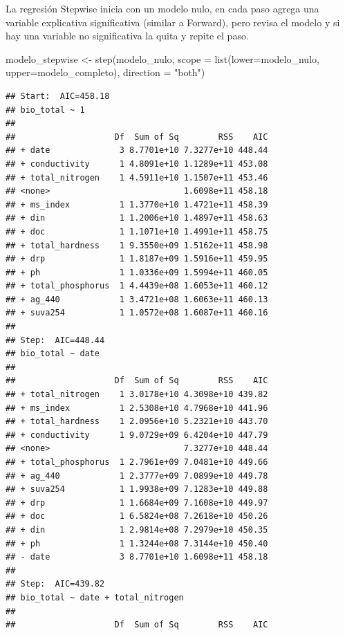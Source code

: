 \documentclass[
]{book}
\newenvironment{Shaded}{\begin{snugshade}}{\end{snugshade}}
\newcommand{\AttributeTok}[1]{\textcolor[rgb]{0.77,0.63,0.00}{#1}}
\newcommand{\FunctionTok}[1]{\textcolor[rgb]{0.00,0.00,0.00}{#1}}
\newcommand{\NormalTok}[1]{#1}
\newcommand{\OtherTok}[1]{\textcolor[rgb]{0.56,0.35,0.01}{#1}}
\newcommand{\StringTok}[1]{\textcolor[rgb]{0.31,0.60,0.02}{#1}}
\begin{document}
La regresión Stepwise inicia con un modelo nulo, en cada paso agrega una variable explicativa significativa (similar a Forward), pero revisa el modelo y si hay una variable no significativa la quita y repite el paso.

\begin{Shaded}
\begin{Highlighting}[]
\NormalTok{modelo\_stepwise }\OtherTok{\textless{}{-}} \FunctionTok{step}\NormalTok{(modelo\_nulo, }\AttributeTok{scope =} \FunctionTok{list}\NormalTok{(}\AttributeTok{lower=}\NormalTok{modelo\_nulo, }\AttributeTok{upper=}\NormalTok{modelo\_completo), }\AttributeTok{direction =} \StringTok{"both"}\NormalTok{)}
\end{Highlighting}
\end{Shaded}

\begin{verbatim}
## Start:  AIC=458.18
## bio_total ~ 1
## 
##                    Df  Sum of Sq        RSS    AIC
## + date              3 8.7701e+10 7.3277e+10 448.44
## + conductivity      1 4.8091e+10 1.1289e+11 453.08
## + total_nitrogen    1 4.5911e+10 1.1507e+11 453.46
## <none>                           1.6098e+11 458.18
## + ms_index          1 1.3770e+10 1.4721e+11 458.39
## + din               1 1.2006e+10 1.4897e+11 458.63
## + doc               1 1.1071e+10 1.4991e+11 458.75
## + total_hardness    1 9.3550e+09 1.5162e+11 458.98
## + drp               1 1.8187e+09 1.5916e+11 459.95
## + ph                1 1.0336e+09 1.5994e+11 460.05
## + total_phosphorus  1 4.4439e+08 1.6053e+11 460.12
## + ag_440            1 3.4721e+08 1.6063e+11 460.13
## + suva254           1 1.0572e+08 1.6087e+11 460.16
## 
## Step:  AIC=448.44
## bio_total ~ date
## 
##                    Df  Sum of Sq        RSS    AIC
## + total_nitrogen    1 3.0178e+10 4.3098e+10 439.82
## + ms_index          1 2.5308e+10 4.7968e+10 441.96
## + total_hardness    1 2.0956e+10 5.2321e+10 443.70
## + conductivity      1 9.0729e+09 6.4204e+10 447.79
## <none>                           7.3277e+10 448.44
## + total_phosphorus  1 2.7961e+09 7.0481e+10 449.66
## + ag_440            1 2.3777e+09 7.0899e+10 449.78
## + suva254           1 1.9938e+09 7.1283e+10 449.88
## + drp               1 1.6684e+09 7.1608e+10 449.97
## + doc               1 6.5824e+08 7.2618e+10 450.26
## + din               1 2.9814e+08 7.2979e+10 450.35
## + ph                1 1.3244e+08 7.3144e+10 450.40
## - date              3 8.7701e+10 1.6098e+11 458.18
## 
## Step:  AIC=439.82
## bio_total ~ date + total_nitrogen
## 
##                    Df  Sum of Sq        RSS    AIC

\end{verbatim}
\end{document}
